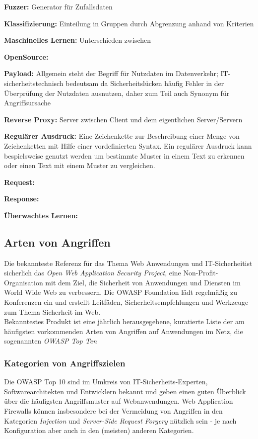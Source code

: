 \textbf{Fuzzer:} Generator für Zufallsdaten

\textbf{Klassifizierung:} Einteilung in Gruppen durch Abgrenzung anhand von Kriterien

\textbf{Maschinelles Lernen:} Unterschieden zwischen 

\textbf{OpenSource:}

\textbf{Payload:} Allgemein steht der Begriff für Nutzdaten im Datenverkehr; IT-sicherheitstechnisch bedeutsam da Sicherheitslücken häufig Fehler in der Überprüfung der Nutzdaten ausnutzen, daher zum Teil auch Synonym für Angriffsursache

\textbf{Reverse Proxy:} Server zwischen Client und dem eigentlichen Server/Servern 

\textbf{Regulärer Ausdruck:} Eine Zeichenkette zur Beschreibung einer Menge von Zeichenketten mit Hilfe einer vordefinierten Syntax. Ein regulärer Ausdruck kann bespielsweise genutzt werden um bestimmte Muster in einem Text zu erkennen oder einen Text mit einem Muster zu vergleichen.

\textbf{Request:} 

\textbf{Response:}

\textbf{Überwachtes Lernen:} 

\subsection{Arten von Angriffen}

Die bekannteste Referenz für das Thema \glqq Web Anwendungen und IT-Sicherheit\grqq  ist sicherlich das \emph{Open Web Application Security Project\textsuperscript{\textregistered}}, eine Non-Profit-Organisation mit dem Ziel, die Sicherheit von Anwendungen und Diensten im World Wide Web zu verbessern\cite{wpowasp}. Die OWASP Foundation lädt regelmäßig zu Konferenzen ein und erstellt Leitfäden, Sicherheitsempfehlungen und Werkzeuge zum Thema Sicherheit im Web.\\
Bekanntestes Produkt ist eine jährlich herausgegebene, kuratierte Liste der am häufigsten vorkommenden Arten von Angriffen auf Anwendungen im Netz, die sogenannten \emph{OWASP Top Ten}\cite{owasp10}

\subsubsection{Kategorien von Angriffszielen}

Die OWASP Top 10 sind im Umkreis von IT-Sicherheits-Experten, Softwarearchitekten und Entwicklern bekannt und geben einen guten Überblick über die häufigsten Angriffsmuster auf Webanwendungen. Web Application Firewalls können insbesondere bei der Vermeidung von Angriffen in den Kategorien \emph{Injection} und \emph{Server-Side Request Forgery} nützlich sein - je nach Konfiguration aber auch in den (meisten) anderen Kategorien.  


